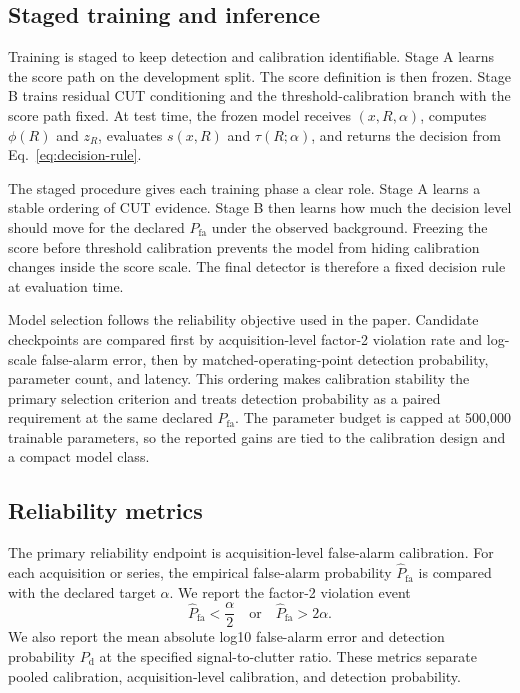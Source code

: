 \documentclass[preprint,12pt]{elsarticle}
\begin{document}
\subsection{Staged training and inference}
\label{subsec:training-inference}

Training is staged to keep detection and calibration identifiable. Stage A
learns the score path on the development split. The score definition is then
frozen. Stage B trains residual CUT conditioning and the threshold-calibration
branch with the score path fixed. At test time, the frozen model receives
$(x,R,\alpha)$, computes $\phi(R)$ and $z_R$, evaluates $s(x,R)$ and
$\tau(R;\alpha)$, and returns the decision from Eq.~\eqref{eq:decision-rule}.

The staged procedure gives each training phase a clear role. Stage A learns a
stable ordering of CUT evidence. Stage B then learns how much the decision
level should move for the declared $P_{\mathrm{fa}}$ under the observed
background. Freezing the score before threshold calibration prevents the model
from hiding calibration changes inside the score scale. The final detector is
therefore a fixed decision rule at evaluation time.

Model selection follows the reliability objective used in the paper. Candidate
checkpoints are compared first by acquisition-level factor-2 violation rate and
log-scale false-alarm error, then by matched-operating-point detection
probability, parameter count, and latency. This ordering makes calibration
stability the primary selection criterion and treats detection probability as a
paired requirement at the same declared $P_{\mathrm{fa}}$. The parameter budget
is capped at 500,000 trainable parameters, so the reported gains are tied to the
calibration design and a compact model class.

\subsection{Reliability metrics}
\label{subsec:reliability-metrics}

The primary reliability endpoint is acquisition-level false-alarm calibration.
For each acquisition or series, the empirical false-alarm probability
$\widehat{P}_{\mathrm{fa}}$ is compared with the declared target $\alpha$. We
report the factor-2 violation event
\begin{equation}
  \widehat{P}_{\mathrm{fa}} < \frac{\alpha}{2}
  \quad \text{or} \quad
  \widehat{P}_{\mathrm{fa}} > 2\alpha.
\end{equation}
We also report the mean absolute log10 false-alarm error and detection
probability $P_{\mathrm{d}}$ at the specified signal-to-clutter ratio. These
metrics separate pooled calibration, acquisition-level calibration, and
detection probability.
\end{document}
